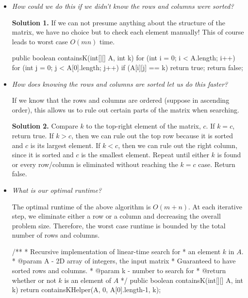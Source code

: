 \begin{itemize}
    \item \textit{How could we do this if we didn't know the rows and columns were sorted?}
    
    \textbf{Solution 1.} If we can not presume anything about the structure of the matrix, we have no choice but to check each element manually! This of course leads to worst case $O(mn)$ time.

    \begin{java}
        public boolean containsK(int[][] A, int k) {
            for (int i = 0; i < A.length; i++)
                for (int j = 0; j < A[0].length; j++)
                    if (A[i][j] == k)
                        return true;
            return false;
        }
    \end{java}

    \item \textit{How does knowing the rows and columns are sorted let us do this faster?}

    If we know that the rows and columns are ordered (suppose in ascending order), this allows us to rule out certain parts of the matrix when searching.

    \textbf{Solution 2.} Compare $k$ to the top-right element of the matrix, $c$. If $k = c$, return true. If $k > c$, then we can rule out the top row because it is sorted and $c$ is its largest element. If $k < c$, then we can rule out the right column, since it is sorted and $c$ is the smallest element. Repeat until either $k$ is found or every row/column is eliminated without reaching the $k=c$ case. Return false.

    \item \textit{What is our optimal runtime?}

    The optimal runtime of the above algorithm is $O(m+n)$. At each iterative step, we eliminate either a row or a column and decreasing the overall problem size. Therefore, the worst case runtime is bounded by the total number of rows and columns.

    \begin{java}
        /**
         * Recursive implementation of linear-time search for
         * an element $k$ in $A$.
         * @param A - 2D array of integers, the input matrix
         * Guaranteed to have sorted rows and columns.
         * @param k - number to search for
         * @return whether or not $k$ is an element of $A$
         */
        public boolean containsK(int[][] A, int k) {
            return containsKHelper(A, 0, A[0].length-1, k);
        }


\end{java}
\end{itemize}
